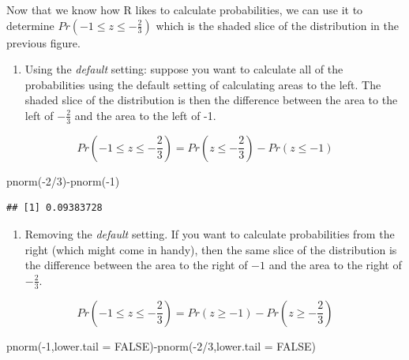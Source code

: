 \documentclass[
]{book}
\newenvironment{Shaded}{\begin{snugshade}}{\end{snugshade}}
\newcommand{\AttributeTok}[1]{\textcolor[rgb]{0.77,0.63,0.00}{#1}}
\newcommand{\ConstantTok}[1]{\textcolor[rgb]{0.00,0.00,0.00}{#1}}
\newcommand{\DecValTok}[1]{\textcolor[rgb]{0.00,0.00,0.81}{#1}}
\newcommand{\FunctionTok}[1]{\textcolor[rgb]{0.00,0.00,0.00}{#1}}
\newcommand{\NormalTok}[1]{#1}
\newcommand{\SpecialCharTok}[1]{\textcolor[rgb]{0.00,0.00,0.00}{#1}}
\providecommand{\tightlist}{%
  \setlength{\itemsep}{0pt}\setlength{\parskip}{0pt}}
\begin{document}
Now that we know how R likes to calculate probabilities, we can use it to determine \(Pr(-1 \leq z \leq -\frac{2}{3})\) which is the shaded slice of the distribution in the previous figure.

\begin{enumerate}
\def\labelenumi{\arabic{enumi}.}
\tightlist
\item
  Using the \emph{default} setting: suppose you want to calculate all of the probabilities using the default setting of calculating areas to the left. The shaded slice of the distribution is then the difference between the area to the left of \(-\frac{2}{3}\) and the area to the left of -1.
\end{enumerate}

\[Pr\left(-1 \leq z \leq -\frac{2}{3}\right)=Pr\left(z \leq -\frac{2}{3}\right) - Pr\left(z \leq -1\right)\]

\begin{Shaded}
\begin{Highlighting}[]
\FunctionTok{pnorm}\NormalTok{(}\SpecialCharTok{{-}}\DecValTok{2}\SpecialCharTok{/}\DecValTok{3}\NormalTok{)}\SpecialCharTok{{-}}\FunctionTok{pnorm}\NormalTok{(}\SpecialCharTok{{-}}\DecValTok{1}\NormalTok{)}
\end{Highlighting}
\end{Shaded}

\begin{verbatim}
## [1] 0.09383728
\end{verbatim}

\begin{enumerate}
\def\labelenumi{\arabic{enumi}.}
\setcounter{enumi}{1}
\tightlist
\item
  Removing the \emph{default} setting. If you want to calculate probabilities from the right (which might come in handy), then the same slice of the distribution is the difference between the area to the right of \(-1\) and the area to the right of \(-\frac{2}{3}\).
\end{enumerate}

\[Pr\left(-1 \leq z \leq -\frac{2}{3}\right)=Pr(z \geq -1) - Pr\left(z \geq -\frac{2}{3}\right)\]

\begin{Shaded}
\begin{Highlighting}[]
\FunctionTok{pnorm}\NormalTok{(}\SpecialCharTok{{-}}\DecValTok{1}\NormalTok{,}\AttributeTok{lower.tail =} \ConstantTok{FALSE}\NormalTok{)}\SpecialCharTok{{-}}\FunctionTok{pnorm}\NormalTok{(}\SpecialCharTok{{-}}\DecValTok{2}\SpecialCharTok{/}\DecValTok{3}\NormalTok{,}\AttributeTok{lower.tail =} \ConstantTok{FALSE}\NormalTok{)}
\end{Highlighting}
\end{Shaded}
\end{document}
